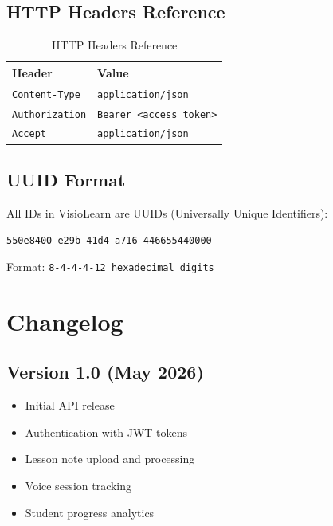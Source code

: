 \documentclass[12pt,a4paper,oneside]{article}
\begin{document}
\subsection{HTTP Headers Reference}

\begin{table}[H]
\centering
\small
\begin{tabular}{|l|l|}
\hline
\textbf{Header} & \textbf{Value} \\
\hline
\texttt{Content-Type} & \texttt{application/json} \\
\texttt{Authorization} & \texttt{Bearer <access\_token>} \\
\texttt{Accept} & \texttt{application/json} \\
\hline
\end{tabular}
\caption{HTTP Headers Reference}
\end{table}

\subsection{UUID Format}

All IDs in VisioLearn are UUIDs (Universally Unique Identifiers):

\begin{center}
\texttt{550e8400-e29b-41d4-a716-446655440000}
\end{center}

Format: \texttt{8-4-4-4-12 hexadecimal digits}

\section{Changelog}

\subsection{Version 1.0 (May 2026)}

\begin{itemize}
    \item Initial API release
    \item Authentication with JWT tokens
    \item Lesson note upload and processing
    \item Voice session tracking
    \item Student progress analytics
\end{itemize}

\end{document}
